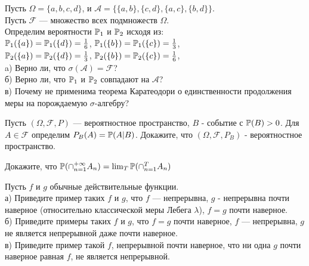 \begin{problem}
Пусть $\Omega=\{a,b,c,d\}$, и
$\mathcal{A}=\{\{a,b\},\{c,d\},\{a,c\},\{b,d\}\}$. \\
Пусть $\mathcal{F}$ — множество всех подмножеств $\Omega$. \\
Определим вероятности $\P_{1}$ и $\P_{2}$ исходя
из: \\
$\P_{1}(\{a\})=\P_{1}(\{d\})=\frac{1}{6}$,
$\P_{1}(\{b\})=\P_{1}(\{c\})=\frac{1}{3}$, \\
$\P_{2}(\{a\})=\P_{2}(\{d\})=\frac{1}{3}$,
$\P_{2}(\{b\})=\P_{2}(\{c\})=\frac{1}{6}$, \\
a) Верно ли, что $\sigma(\mathcal{A})=\mathcal{F}$? \\
б) Верно ли, что $\P_{1}$ и $\P_{2}$ совпадают на
$\mathcal{A}$? \\
в) Почему не применима теорема Каратеодори о единственности
продолжения меры на порождаемую $\sigma$-алгебру?

\begin{sol}

\end{sol}
\end{problem}

\begin{problem}
Пусть $(\Omega,\mathcal{F},P)$ — вероятностное пространство, $B$ -
событие с $\P(B)>0$. Для $A\in \mathcal{F}$ определим
$P_{B}(A)=\P(A|B)$. Докажите, что $(\Omega,\mathcal{F},P_{B})$ -
вероятностное пространство.

\begin{sol}

\end{sol}
\end{problem}

\begin{problem}
Докажите, что
$\P(\cap_{n=1}^{+\infty}A_{n})=\lim_{T}\P(\cap_{n=1}^{T}A_{n})$

\begin{sol}

\end{sol}
\end{problem}

\begin{problem}
Пусть $f$ и $g$ обычные действительные функции. \\
а) Приведите пример таких $f$ и $g$, что $f$ — непрерывна, $g$ -
непрерывна почти наверное (относительно
классической меры Лебега $\lambda$), $f=g$ почти наверное. \\
б) Приведите примеры таких $f$ и $g$, что $f=g$ почти наверное,
$f$ — непрерывна, $g$ не является непрерывной даже почти наверное. \\
в) Приведите пример такой $f$, непрерывной почти наверное, что ни
одна $g$ почти наверное равная $f$, не является непрерывной.

\begin{sol}

\end{sol}
\end{problem}

